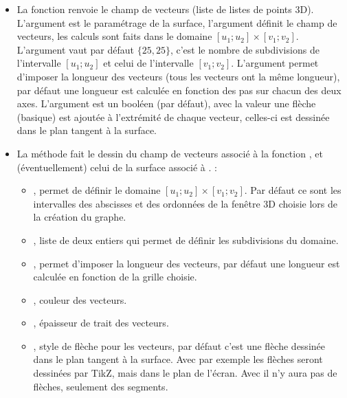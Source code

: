 \begin{itemize}
    \item La fonction  renvoie le champ de vecteurs (liste de listes de points 3D). L'argument  est le paramétrage de la surface, l'argument  définit le champ de vecteurs, les calculs sont faits dans le domaine $[u_1;u_2]\times[v_1;v_2]$. L'argument  vaut par défaut $\{25,25\}$, c'est le nombre de subdivisions de l'intervalle $[u_1;u_2]$ et celui de l'intervalle $[v_1;v_2]$. L'argument  permet d'imposer la longueur des vecteurs (tous les vecteurs ont la même longueur), par défaut une longueur est calculée en fonction des pas sur chacun des deux axes. L'argument  est un booléen (\false par défaut), avec la valeur \true une flèche (basique) est ajoutée à l'extrémité de chaque vecteur, celles-ci est dessinée dans le plan tangent à la surface.
    
    \item La méthode  fait le dessin du champ de vecteurs associé à la fonction , et (éventuellement) celui de la surface associé à . \writeoptions :
        \begin{itemize}
            \item {}, permet de définir le domaine $[u_1;u_2]\times [v_1;v_2]$. Par défaut ce sont les intervalles des abscisses et des ordonnées de la fenêtre 3D choisie lors de la création du graphe.
            
            \item {}, liste de deux entiers qui permet de définir les subdivisions du domaine.
            
            \item {}, permet d'imposer la longueur des vecteurs, par défaut une longueur est calculée en fonction de la grille choisie.
            
            \item {}, couleur des vecteurs.
            
            \item {}, épaisseur de trait des vecteurs.
            
            \item {}, style de flèche pour les vecteurs, par défaut c'est une flèche dessinée dans le plan tangent à la surface. Avec par exemple  les flèches seront dessinées par TikZ, mais dans le plan de l'écran. Avec  il n'y aura pas de flèches, seulement des segments.
            

\end{itemize}
\end{itemize}
